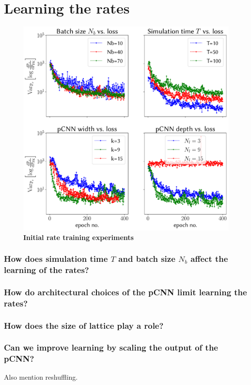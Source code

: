 \section{Learning the rates} 
\begin{figure}
	\centering
	\includegraphics[width=\linewidth]{Chapter5/Figs/Vector/init_test_learning}
	\caption[Initial rate training experiments]{\textbf{Initial rate training experiments}}
	\label{fig:inittestlearning}
\end{figure}

\subsubsection{How does simulation time $T$ and batch size $N_b$ affect the learning of the rates?}

\subsubsection{How do architectural choices of the pCNN limit learning the rates?}

\subsubsection{How does the size of lattice play a role?}

\subsubsection{Can we improve learning by scaling the output of the pCNN?}
Also mention reshuffling.

